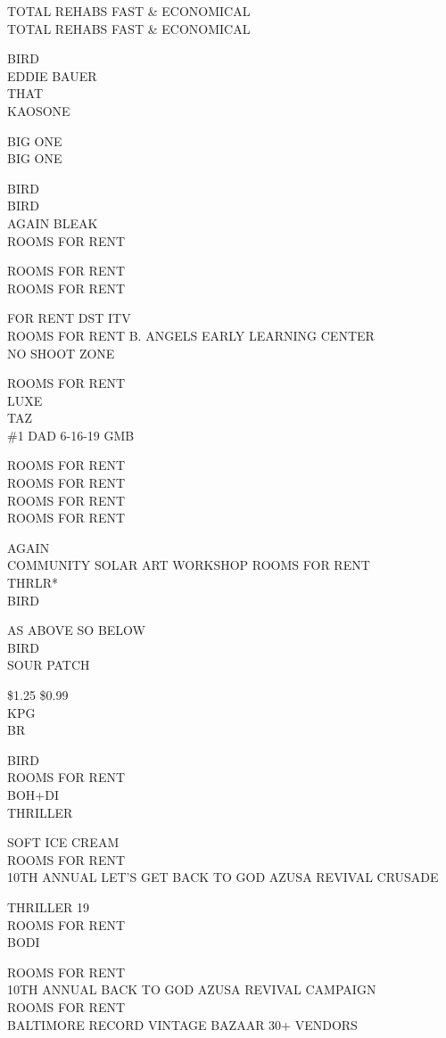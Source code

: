 \documentclass[10pt,letterpaper]{article}
\begin{document}
TOTAL REHABS FAST \& ECONOMICAL\\
TOTAL REHABS FAST \& ECONOMICAL

BIRD\\
EDDIE BAUER\\
THAT\\
KAOSONE

BIG ONE\\
BIG ONE

BIRD\\
BIRD\\
AGAIN BLEAK\\
ROOMS FOR RENT

ROOMS FOR RENT\\
ROOMS FOR RENT

FOR RENT DST ITV\\
ROOMS FOR RENT B. ANGELS EARLY LEARNING CENTER\\
NO SHOOT ZONE

ROOMS FOR RENT\\
LUXE\\
TAZ\\
\#1 DAD 6{-}16{-}19 GMB

ROOMS FOR RENT\\
ROOMS FOR RENT\\
ROOMS FOR RENT\\
ROOMS FOR RENT

AGAIN\\
COMMUNITY SOLAR ART WORKSHOP ROOMS FOR RENT\\
THRLR*\\
BIRD

AS ABOVE SO BELOW\\
BIRD\\
SOUR PATCH

\$1.25 \$0.99\\
KPG\\
BR

BIRD\\
ROOMS FOR RENT\\
BOH+DI\\
THRILLER

SOFT ICE CREAM\\
ROOMS FOR RENT\\
10TH ANNUAL LET'S GET BACK TO GOD AZUSA REVIVAL CRUSADE

THRILLER 19\\
ROOMS FOR RENT\\
BODI

ROOMS FOR RENT\\
10TH ANNUAL BACK TO GOD AZUSA REVIVAL CAMPAIGN\\
ROOMS FOR RENT\\
BALTIMORE RECORD VINTAGE BAZAAR 30+ VENDORS
\end{document}
